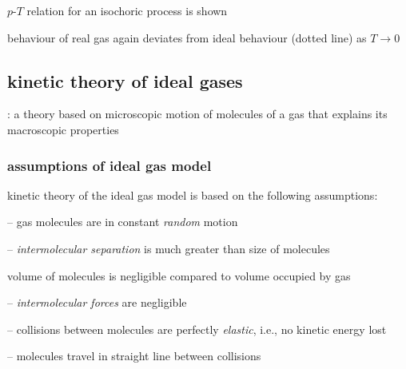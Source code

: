 $p$-$T$ relation for an isochoric process is shown

\cmt behaviour of real gas again deviates from ideal behaviour (dotted line) as $T\to0$





\subsection{kinetic theory of ideal gases}

: a theory based on microscopic motion of molecules of a gas that explains its macroscopic properties

\subsubsection{assumptions of ideal gas model}

\rcyskip

\begin{ilight}
	
kinetic theory of the ideal gas model is based on the following assumptions:

\begin{compactitem}
	
\item[--] gas molecules are in constant \emph{random} motion
	
\item[--] \emph{intermolecular separation} is much greater than size of molecules

volume of molecules is negligible compared to volume occupied by gas

\item[--] \emph{intermolecular forces} are negligible

\item[--] collisions between molecules are perfectly \emph{elastic}, i.e., no kinetic energy lost

\item[--] molecules travel in straight line between collisions
\end{compactitem}

\end{ilight}


